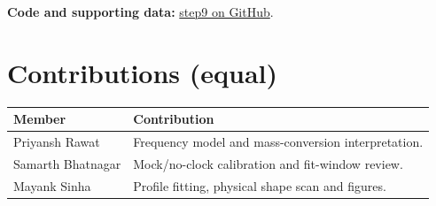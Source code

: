 \documentclass[11pt,a4paper]{article}
\begin{document}
\textbf{Code and supporting data:} \href{https://github.com/rawatpriyansh17/QFT-PROJECT-GROUP-B/tree/main/step9}{step9 on GitHub}.\newpage\section*{Contributions (equal)}\begin{center}\begin{tabularx}{\linewidth}{p{33mm}X}\toprule Member & Contribution\\\midrule Priyansh Rawat & Frequency model and mass-conversion interpretation.\\[3mm]Samarth Bhatnagar & Mock/no-clock calibration and fit-window review.\\[3mm]Mayank Sinha & Profile fitting, physical shape scan and figures.\\\bottomrule\end{tabularx}\end{center}
\end{document}
